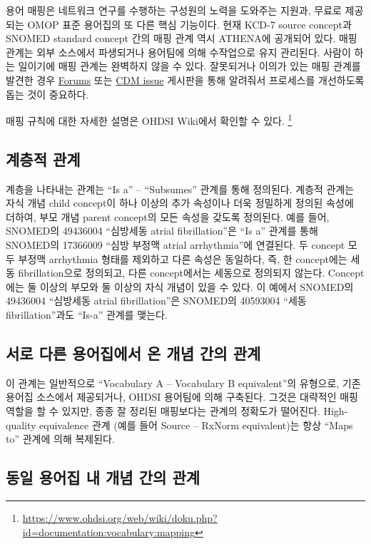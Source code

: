 \documentclass[10.5pt]{book}
\let\rmarkdownfootnote\footnote%
\def\footnote{\protect\rmarkdownfootnote}
\theoremstyle{definition}
\theoremstyle{definition}
\theoremstyle{definition}
\theoremstyle{remark}
\begin{document}
용어 매핑은 네트워크 연구를 수행하는 구성원의 노력을 도와주는 지원과,
무료로 제공되는 OMOP 표준 용어집의 또 다른 핵심 기능이다. 현재 KCD-7
source concept과 SNOMED standard concept 간의 매핑 관계 역시 ATHENA에
공개되어 있다. 매핑 관계는 외부 소스에서 파생되거나 용어팀에 의해
수작업으로 유지 관리된다. 사람이 하는 일이기에 매핑 관계는 완벽하지 않을
수 있다. 잘못되거나 이의가 있는 매핑 관계를 발견한 경우
\href{https://forums.ohdsi.org}{Forums} 또는
\href{https://github.com/OHDSI/CommonDataModel/issues}{CDM issue}
게시판을 통해 알려줘서 프로세스를 개선하도록 돕는 것이 중요하다.

매핑 규칙에 대한 자세한 설명은 OHDSI Wiki에서 확인할 수 있다. \footnote{\url{https://www.ohdsi.org/web/wiki/doku.php?id=documentation:vocabulary:mapping}}

\subsection{계층적 관계}\label{-}

계층을 나타내는 관계는 ``Is a'' -- ``Subsumes'' 관계를 통해 정의된다.
계층적 관계는 자식 개념 child concept이 하나 이상의 추가 속성이나 더욱
정밀하게 정의된 속성에 더하여, 부모 개념 parent concept의 모든 속성을
갖도록 정의된다. 예를 들어, SNOMED의 49436004 ``심방세동 atrial
fibrillation''은 ``Is a'' 관계를 통해 SNOMED의 17366009 ``심방 부정맥
atrial arrhythmia''에 연결된다. 두 concept 모두 부정맥 arrhythmia 형태를
제외하고 다른 속성은 동일하다, 즉, 한 concept에는 세동 fibrillation으로
정의되고, 다른 concept에서는 세동으로 정의되지 않는다. Concept에는 둘
이상의 부모와 둘 이상의 자식 개념이 있을 수 있다. 이 예에서 SNOMED의
49436004 ``심방세동 atrial fibrillation''은 SNOMED의 40593004 ``세동
fibrillation''과도 ``Is-a'' 관계를 맺는다. 

\subsection{서로 다른 용어집에서 온 개념 간의 관계}\label{------}

이 관계는 일반적으로 ``Vocabulary A -- Vocabulary B equivalent''의
유형으로, 기존 용어집 소스에서 제공되거나, OHDSI 용어팀에 의해 구축된다.
그것은 대략적인 매핑 역할을 할 수 있지만, 종종 잘 정리된 매핑보다는
관계의 정확도가 떨어진다. High-quality equivalence 관계 (예를 들어
Source -- RxNorm equivalent)는 항상 ``Maps to'' 관계에 의해 복제된다.

\subsection{동일 용어집 내 개념 간의 관계}\label{-----}
\end{document}
